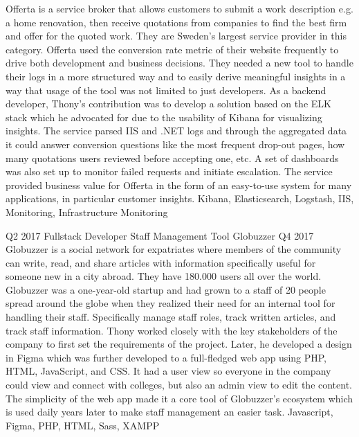 \begin{experiences}
{        Offerta is a service broker that allows customers to submit a work description e.g. a home renovation, then receive quotations from companies to find the best firm and offer for the quoted work.
        They are Sweden's largest service provider in this category.
        \newline \newline
        Offerta used the conversion rate metric of their website frequently to drive both development and business decisions.
        They needed a new tool to handle their logs in a more structured way and to easily derive meaningful insights in a way that usage of the tool was not limited to just developers.
        \newline \newline
        As a backend developer, Thony's contribution was to develop a solution based on the ELK stack which he advocated for due to the usability of Kibana for visualizing insights.
        The service parsed IIS and .NET logs and through the aggregated data it could answer conversion questions like the most frequent drop-out pages, how many quotations users reviewed before accepting one, etc.
        A set of dashboards was also set up to monitor failed requests and initiate escalation.
        The service provided business value for Offerta in the form of an easy-to-use system for many applications, in particular customer insights.
        \newline
    }
    {Kibana, Elasticsearch, Logstash, IIS, Monitoring, Infrastructure Monitoring}  
    \emptySeparator
    
    \experience
    {Q2 2017}   
    {Fullstack Developer}
    {Staff Management Tool}
    {Globuzzer}
    {Q4 2017} {
        Globuzzer is a social network for expatriates where members of the community can write, read, and share articles with information specifically useful for someone new in a city abroad.
        They have 180.000 users all over the world.
        \newline \newline
        Globuzzer was a one-year-old startup and had grown to a staff of 20 people spread around the globe when they realized their need for an internal tool for handling their staff.
        Specifically manage staff roles, track written articles, and track staff information.
        \newline \newline
        Thony worked closely with the key stakeholders of the company to first set the requirements of the project.
        Later, he developed a design in Figma which was further developed to a full-fledged web app using PHP, HTML, JavaScript, and CSS.
        It had a user view so everyone in the company could view and connect with colleges, but also an admin view to edit the content.
        The simplicity of the web app made it a core tool of Globuzzer's ecosystem which is used daily years later to make staff management an easier task.
        \newline
    }
    {Javascript, Figma, PHP, HTML, Sass, XAMPP}  
    
\end{experiences}
